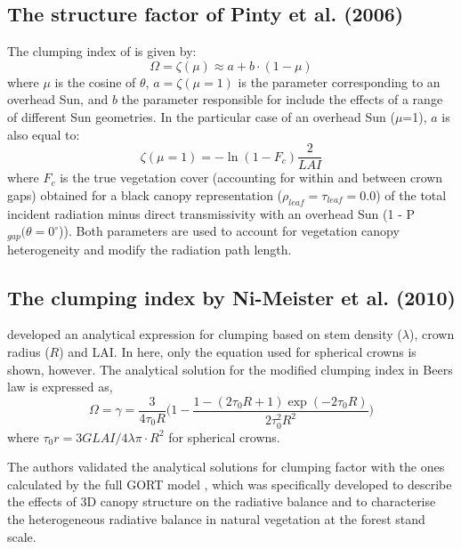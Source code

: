 \subsection{The structure factor of Pinty et al. (2006)}

The clumping index of \citet{pinty2006} is given by:
\begin{equation}
\Omega = \zeta(\mu) \approx a + b \cdot (1 - \mu)
\label{equation:structurefactor}
\end{equation}
\noindent where $\mu$ is the cosine of $\theta$, $a = \zeta(\mu=1)$ is the parameter corresponding to an overhead Sun, and $b$ the parameter responsible for include the effects of a range of different Sun geometries. In the particular case of an overhead Sun ($\mu$=1), $a$ is also equal to:
 \begin{equation}
\zeta(\mu=1) = -\ln{(1 - F_c)}\frac{2}{LAI}
\label{equation:structurefactora}
\end{equation}
\noindent where $F_c$ is the true vegetation cover (accounting for within and between crown gaps) obtained for a black canopy representation ($\rho_{leaf} = \tau_{leaf} = 0.0$) of the total incident radiation minus direct transmissivity with an overhead Sun (1 - P$_{gap}(\theta = 0^{\circ}$)). Both parameters are used to account for vegetation canopy heterogeneity and modify the radiation path length.

\subsection{The clumping index by Ni-Meister et al. (2010)}
\citet{Ni-Meister2010} developed an analytical expression for clumping based on stem density ($\lambda$), crown radius ($R$) and LAI. In here, only the equation used for spherical crowns is shown, however. The analytical solution for the modified clumping index in Beer\textquotesingle s law is expressed as, 
\begin{equation}
\Omega = \gamma = \frac{3}{4\tau_0R}\Big(1 - \frac{1 - (2\tau_0R + 1)\exp(-2\tau_0R)}{2\tau_0^2R^2}\Big)
\label{equation:clumpNi}
\end{equation}
\noindent where $\tau_0r = 3 G LAI/ 4 \lambda \pi \cdot R^2$ for spherical crowns. 

The authors validated the analytical solutions for clumping factor with the ones calculated by the full GORT model \citep{Li1995}, which was specifically developed to describe the effects of 3D canopy structure on the radiative balance and to characterise the heterogeneous radiative balance in natural vegetation at the forest stand scale.

